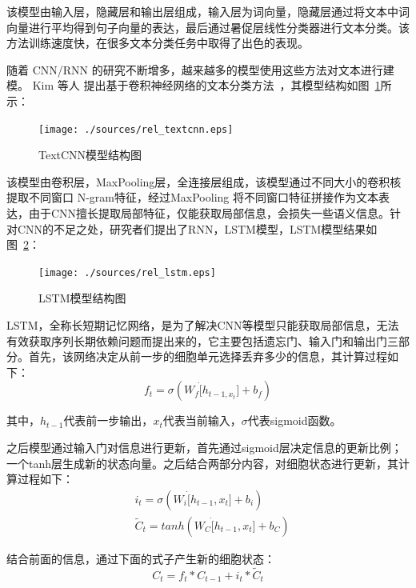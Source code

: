 该模型由输入层，隐藏层和输出层组成，输入层为词向量，隐藏层通过将文本中词向量进行平均得到句子向量的表达，最后通过暑促层线性分类器进行文本分类。该方法训练速度快，在很多文本分类任务中取得了出色的表现。

随着 CNN/RNN 的研究不断增多，越来越多的模型使用这些方法对文本进行建模。 Kim 等人
提出基于卷积神经网络的文本分类方法~\cite{Kim14}，其模型结构如图~\ref{fig:textcnn}所示：
\begin{figure}[htb]
    \centering
    \texttt{[image: ./sources/rel\_textcnn.eps]}
    \vspace{-10pt}
    \caption{\label{fig:textcnn} TextCNN模型结构图}
    \vspace{-5pt}
\end{figure}

该模型由卷积层，MaxPooling层，全连接层组成，该模型通过不同大小的卷积核提取不同窗口 N-gram特征，经过MaxPooling 将不同窗口特征拼接作为文本表达，由于CNN擅长提取局部特征，仅能获取局部信息，会损失一些语义信息。针对CNN的不足之处，研究者们提出了RNN，LSTM模型，LSTM模型结果如图~\ref{fig:lstm}：
\begin{figure}[htb]
    \centering
    \texttt{[image: ./sources/rel\_lstm.eps]}
    \vspace{-10pt}
    \caption{\label{fig:lstm} LSTM模型结构图}
    \vspace{-5pt}
\end{figure}

LSTM，全称长短期记忆网络，是为了解决CNN等模型只能获取局部信息，无法有效获取序列长期依赖问题而提出来的，它主要包括遗忘门、输入门和输出门三部分。首先，该网络决定从前一步的细胞单元选择丢弃多少的信息，其计算过程如下：
\begin{equation}
    f_t = \sigma(W_f\dot[h_{t-1,x_t}] + b_f)
\end{equation}

其中，$h_{t-1}$代表前一步输出，$x_t$代表当前输入，$\sigma$代表sigmoid函数。

之后模型通过输入门对信息进行更新，首先通过sigmoid层决定信息的更新比例；一个tanh层生成新的状态向量。之后结合两部分内容，对细胞状态进行更新，其计算过程如下：
\begin{equation}
    \begin{aligned}
        & i_t = \sigma(W_i\dot[h_{t-1},x_t]+b_i) \\
        & \tilde{C}_t=tanh(W_C\dot[h_{t-1},x_t]+b_C)
    \end{aligned}
\end{equation}

结合前面的信息，通过下面的式子产生新的细胞状态：
\begin{equation}
    C_t=f_t*C_{t-1}+i_t*\tilde{C}_t
\end{equation}

